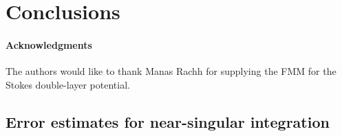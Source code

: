 \documentclass[preprint, 10pt]{elsarticle}
\begin{document}
\section{Conclusions\label{s:conclusions}}


\paragraph{\bf Acknowledgments} The authors would like to thank Manas Rachh
for supplying the FMM for the Stokes double-layer potential.


\begin{appendices}
\section{Error estimates for near-singular integration \label{A:AppendixA}} 
\end{appendices}


 

\end{document}
